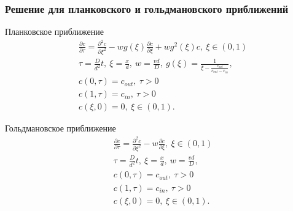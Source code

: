 \documentclass[10pt,pdf]{beamer}
\newcommand{\pder}[2] {\frac{\partial #1}{\partial #2}}
\newcommand{\ppder}[2]{\frac{\partial^2 #1}{\partial {#2}^2}}
\begin{document}
  \begin{frame}
      \frametitle{Решение для планковского и гольдмановского приближений}

      \begin{minipage}{.47\textwidth}
      Планковское приближение
          \begingroup
\everymath{\scriptstyle}
\scriptsize
        \begin{align*}
        & \pder{c}{\tau} = \ppder{c}{\xi} - wg(\xi)\pder{c}{\xi} + wg^2(\xi)c,
            \ \xi\in(0,1) \\
        & \tau = \frac{D}{d^2}t,\ \xi = \frac{x}{d},\ w = \frac{vd}{D},
        \ g(\xi) = \frac{1}{\xi - \frac{c_{out}}{c_{out} - c_{in}}},\\
        & c(0, \tau) = c_{out},\ \tau>0 \\
        & c(1, \tau) = c_{in},\ \tau>0 \\
        & c(\xi, 0) = 0,\ \xi\in(0,1).
    \end{align*}
\endgroup
\end{minipage}\hfill
      \begin{minipage}{.47\textwidth}
      Гольдмановское приближение
\begingroup
\everymath{\scriptstyle}
\scriptsize
        \begin{align*}
            & \pder{c}{\tau} = \ppder{c}{\xi} -
                w\pder{c}{\xi},\ \xi\in(0,1) \\
            & \tau = \frac{D}{d^2}t,\ \xi = \frac{x}{d},\ w = \frac{vd}{D},\\
            & c(0, \tau) = c_{out},\ \tau>0 \\
            & c(1, \tau) = c_{in},\ \tau>0 \\
            & c(\xi, 0) = 0,\ \xi\in(0,1).
        \end{align*}
\endgroup
    \end{minipage}\hfill
\end{frame}
\end{document}

